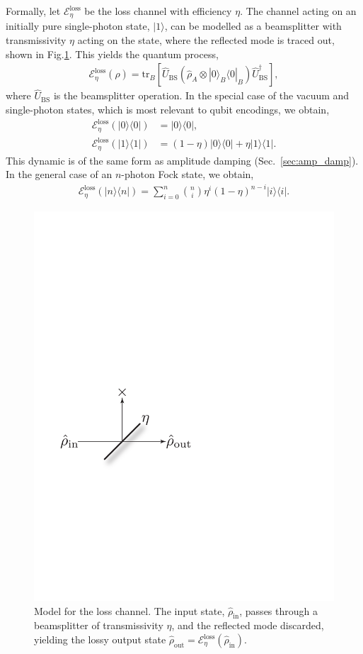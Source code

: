 \documentclass[aps, rmp, twocolumn, amsmath, amssymb, nofootinbib, superscriptaddress, longbibliography, floatfix, table-of-contents, eqsecnum]{revtex4-1}
\newcommand{\bra}[1]{\langle#1|}
\newcommand{\ket}[1]{|#1\rangle}
\begin{document}
Formally, let $\mathcal{E}^\text{loss}_\eta$ be the loss channel with efficiency $\eta$. The channel acting on an initially pure single-photon state, $\ket{1}$, can be modelled as a beamsplitter with transmissivity $\eta$ acting on the state, where the reflected mode is traced out, shown in Fig.\ref{fig:loss_model}. This yields the quantum process,
\begin{align}
\mathcal{E}^\text{loss}_\eta(\hat\rho) = \text{tr}_B[\hat{U}_\text{BS}(\hat\rho_A\otimes\ket{0}_B\bra{0}_B)\hat{U}_\text{BS}^\dag],
\end{align}
where $\hat{U}_\text{BS}$ is the beamsplitter operation. In the special case of the vacuum and single-photon states, which is most relevant to qubit encodings, we obtain,
\begin{align}
	\mathcal{E}^\text{loss}_\eta(\ket{0}\bra{0}) &= \ket{0}\bra{0}, \nonumber \\
\mathcal{E}^\text{loss}_\eta(\ket{1}\bra{1}) &= (1-\eta)\ket{0}\bra{0} + \eta\ket{1}\bra{1}.
\end{align}
This dynamic is of the same form as amplitude damping (Sec.~\ref{sec:amp_damp}). In the general case of an $n$-photon Fock state, we obtain,
\begin{align}
	\mathcal{E}^\text{loss}_\eta(\ket{n}\bra{n}) = \sum_{i=0}^n \binom{n}{i} \eta^i(1-\eta)^{n-i} \ket{i}\bra{i}.
\end{align}

\begin{figure}[!htb]
	\includegraphics[width=0.5\columnwidth]{loss_model}
	\caption{Model for the loss channel. The input state, $\hat\rho_\text{in}$, passes through a beamsplitter of transmissivity $\eta$, and the reflected mode discarded, yielding the lossy output state \mbox{$\hat\rho_\text{out} = \mathcal{E}^\text{loss}_\eta(\hat\rho_\text{in})$}.} \label{fig:loss_model} 
\end{figure}
\end{document}
